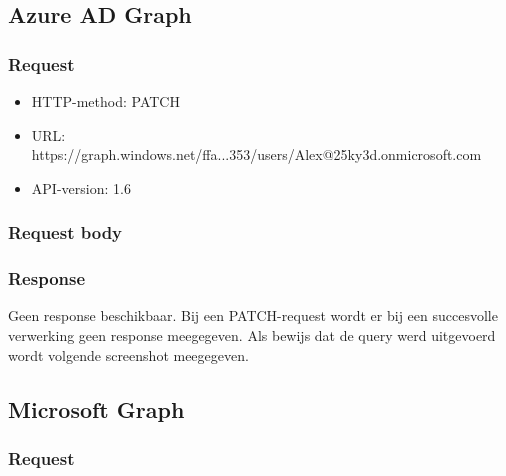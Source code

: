 \subsection{Azure AD Graph}

\subsubsection{Request}

\begin{itemize}
    \item \Ac{HTTP}-method: PATCH
    \item \ac{URL}: https://graph.windows.net/ffa...353/users/Alex@25ky3d.onmicrosoft.com
    \item \Ac{API}-version: 1.6
\end{itemize}

\subsubsection{Request body}


\subsubsection{Response}

Geen response beschikbaar. Bij een PATCH-request wordt er bij een succesvolle verwerking geen response meegegeven. Als bewijs dat de query werd uitgevoerd wordt volgende screenshot meegegeven. 


\subsection{Microsoft Graph}

\subsubsection{Request}

